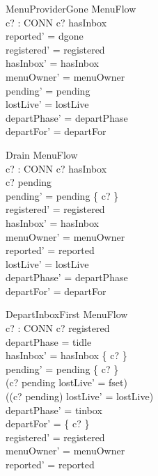 \documentclass[a4paper,10pt,fleqn]{article}
\begin{document}
\begin{schema}{MenuProviderGone}
  \Delta MenuFlow \\
  c? : CONN
\where
  c? \notin hasInbox \\
  reported' = dgone \\
  registered' = registered \\
  hasInbox' = hasInbox \\
  menuOwner' = menuOwner \\
  pending' = pending \\
  lostLive' = lostLive \\
  departPhase' = departPhase \\
  departFor' = departFor
\end{schema}

\begin{schema}{Drain}
  \Delta MenuFlow \\
  c? : CONN
\where
  c? \in hasInbox \\
  c? \in pending \\
  pending' = pending \setminus \{ c? \} \\
  registered' = registered \\
  hasInbox' = hasInbox \\
  menuOwner' = menuOwner \\
  reported' = reported \\
  lostLive' = lostLive \\
  departPhase' = departPhase \\
  departFor' = departFor
\end{schema}


\begin{schema}{DepartInboxFirst}
  \Delta MenuFlow \\
  c? : CONN
\where
  c? \in registered \\
  departPhase = tidle \\
  hasInbox' = hasInbox \setminus \{ c? \} \\
  pending' = pending \setminus \{ c? \} \\
  (c? \in pending \implies lostLive' = fset) \\
  (\lnot (c? \in pending) \implies lostLive' = lostLive) \\
  departPhase' = tinbox \\
  departFor' = \{ c? \} \\
  registered' = registered \\
  menuOwner' = menuOwner \\
  reported' = reported
\end{schema}
\end{document}
